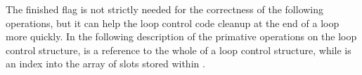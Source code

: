 \begin{description}

\end{description}

\noindent
The finished flag
is not strictly needed for the correctness of the following operations,
but it can help the loop control code cleanup at the end of a loop more quickly.
In the following description of the primative operations
on the loop control structure,
\LC is a reference to the whole of a loop control structure,
while \LCS is an index into the array of slots stored within \LC.

